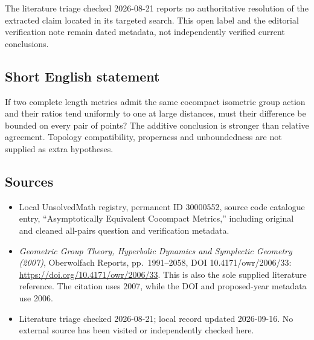 \documentclass[11pt]{article}
\begin{document}
The literature triage checked 2026-08-21 reports no authoritative resolution of the extracted claim located in its targeted search. This open label and the editorial verification note remain dated metadata, not independently verified current conclusions.
\subsection{Short English statement}
If two complete length metrics admit the same cocompact isometric group action and their ratios tend uniformly to one at large distances, must their difference be bounded on every pair of points? The additive conclusion is stronger than relative agreement. Topology compatibility, properness and unboundedness are not supplied as extra hypotheses.
\subsection{Sources}
\begin{itemize}
\item Local UnsolvedMath registry, permanent ID 30000552, source code catalogue entry, ``Asymptotically Equivalent Cocompact Metrics,'' including original and cleaned all-pairs question and verification metadata.
\item \emph{Geometric Group Theory, Hyperbolic Dynamics and Symplectic Geometry (2007)}, Oberwolfach Reports, pp.\ 1991--2058, DOI 10.4171/owr/2006/33: \url{https://doi.org/10.4171/owr/2006/33}. This is also the sole supplied literature reference. The citation uses 2007, while the DOI and proposed-year metadata use 2006.
\item Literature triage checked 2026-08-21; local record updated 2026-09-16. No external source has been visited or independently checked here.
\end{itemize}
\end{document}
